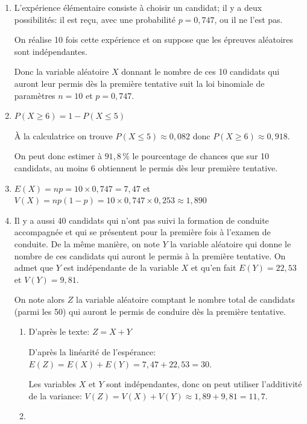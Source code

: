 		\begin{enumerate}
			\item 
L'expérience élémentaire consiste à choisir un candidat; il y a deux possibilités: il est reçu, avec une probabilité $p=0,747$, ou il ne l'est pas.

On réalise 10 fois cette expérience et on suppose que les épreuves aléatoires sont indépendantes.

Donc  la variable aléatoire $X$ donnant le nombre de ces 10 candidats qui auront leur permis dès la première tentative suit la loi binomiale de paramètres $n=10$ et $p=0,747$.

			\item 
$P(X \geqslant 6) = 1-  P(X \leqslant 5)$

À la calculatrice on trouve  $P(X \leqslant 5) \approx 0,082$ donc $P(X \geqslant 6) \approx 0,918$.

On peut donc estimer à $91,8\,\%$ le pourcentage de chances que sur 10 candidats, au moins 6 obtiennent le permis dès leur première tentative.

			\item 
$E(X)=np=10\times 0,747=7,47$ et $V(X)=np\left (1-p\right )=10\times 0,747 \times 0,253 \approx 1,890$

			\item Il y a aussi 40 candidats qui n'ont pas suivi la formation de conduite accompagnée et qui se présentent pour la première fois à l'examen de conduite. De la même manière, on note $Y$ la variable aléatoire qui donne le nombre de ces candidats qui auront le permis à la première tentative. On admet que $Y$ est indépendante de la variable $X$ et qu'en fait $E(Y)=22,53$ et $V(Y)=9,81$.



			On note alors $Z$ la variable aléatoire comptant le nombre total de candidats (parmi les 50) qui auront le permis de conduire dès la première tentative.



			\begin{enumerate}
				\item 
D'après le texte: $Z=X+Y$ 

D'après la linéarité de l'espérance: $E(Z)=E(X)+E(Y) = 7,47+ 22,53 = 30$.

Les variables $X$ et $Y$ sont indépendantes, donc on peut utiliser l'additivité de la variance: $V(Z)=V(X)+V(Y) \approx 1,89 + 9,81 = 11,7$.

	\item 
	

\end{enumerate}
\end{enumerate}

